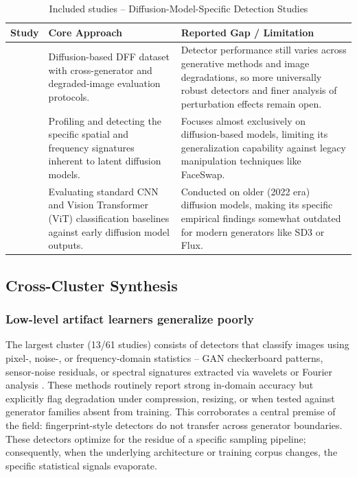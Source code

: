 \documentclass[sn-mathphys-num,Numbered,pdflatex]{sn-jnl}
\begin{document}
\begin{table}[htbp]
\caption{Included studies -- Diffusion-Model-Specific Detection Studies}
\label{tab:diffusion_specific}
\centering\footnotesize
\begin{tabularx}{\columnwidth}{@{}p{} X X@{}}
\toprule
\textbf{Study} & \textbf{Core Approach} & \textbf{Reported Gap / Limitation} \\
\midrule
\cite{RobustnessAnd7} & Diffusion-based DFF dataset with cross-generator and degraded-image evaluation protocols. & Detector performance still varies across generative methods and image degradations, so more universally robust detectors and finer analysis of perturbation effects remain open. \\
\cite{DiffusionDeepfake70} & Profiling and detecting the specific spatial and frequency signatures inherent to latent diffusion models. & Focuses almost exclusively on diffusion-based models, limiting its generalization capability against legacy manipulation techniques like FaceSwap. \\
\cite{TowardsThe71} & Evaluating standard CNN and Vision Transformer (ViT) classification baselines against early diffusion model outputs. & Conducted on older (2022 era) diffusion models, making its specific empirical findings somewhat outdated for modern generators like SD3 or Flux. \\
\bottomrule
\end{tabularx}
\end{table}
\FloatBarrier

\subsection{Cross-Cluster Synthesis}

\subsubsection{Low-level artifact learners generalize poorly}
The largest cluster (13/61 studies) consists of detectors that classify images using pixel-, noise-, or frequency-domain statistics -- GAN checkerboard patterns, sensor-noise residuals, or spectral signatures extracted via wavelets or Fourier analysis \cite{ArtifactFeature20,AnyresolutionAigenerated33,MultipleContexts52,CaenetGeneralized55,WaveletdrivenGeneralizable29,BreakingSemantic34}. These methods routinely report strong in-domain accuracy but explicitly flag degradation under compression, resizing, or when tested against generator families absent from training. This corroborates a central premise of the field: fingerprint-style detectors do not transfer across generator boundaries. These detectors optimize for the residue of a specific sampling pipeline; consequently, when the underlying architecture or training corpus changes, the specific statistical signals evaporate.
\end{document}
